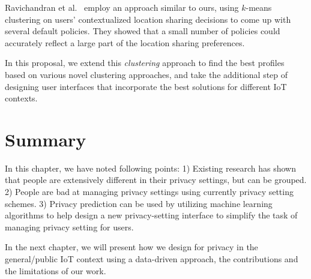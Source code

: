 Ravichandran et al.~\cite{ravichandran2009capturing} employ an approach similar to ours, using $k$-means clustering on users' contextualized location sharing decisions to come up with several default policies. They showed that a small number of policies could accurately reflect a large part of the location sharing preferences. 

In this proposal, we extend this \emph{clustering} approach to find the best profiles based on various novel clustering approaches, and take the additional step of designing user interfaces that incorporate the best solutions for different IoT contexts.

\section{Summary}
In this chapter, we have noted following points: 1) Existing research has shown that people are extensively different in their privacy settings, but can be grouped. 2) People are bad at managing privacy settings using currently privacy setting schemes. 3) Privacy prediction can be used by utilizing machine learning algorithms to help design a new privacy-setting interface to simplify the task of managing privacy setting for users. 

In the next chapter, we will present how we design for privacy in the general/public IoT context using a data-driven approach, the contributions and the limitations of our work.